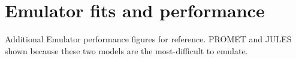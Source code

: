 \documentclass[10pt]{article}
\begin{document}
{\clearpage
\section{Emulator fits and performance}
Additional Emulator performance figures for reference. PROMET and JULES shown because these two models are the most-difficult to emulate.



}
\end{document}
